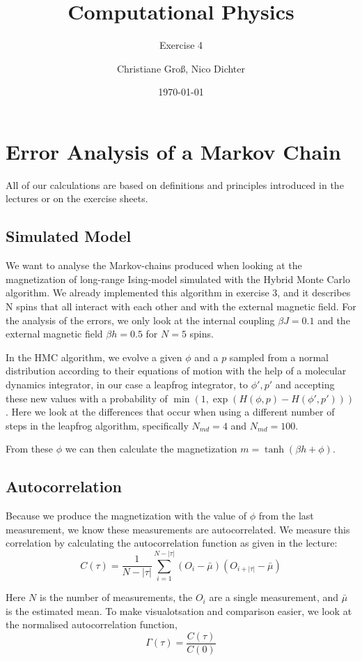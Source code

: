 \documentclass{scrartcl}
\title{Computational Physics}
\subtitle{Exercise 4}
\date{\today}
\author{Christiane Groß, Nico Dichter}
\begin{document}
	\maketitle
\section{Error Analysis of a Markov Chain}
All of our calculations are based on definitions and principles introduced in the lectures or on the exercise sheets.
\subsection{Simulated Model}
We want to analyse the Markov-chains produced when looking at the magnetization of long-range Ising-model simulated with the Hybrid Monte Carlo algorithm. We already implemented this algorithm in exercise 3, and it describes N spins that all interact with each other and with the external magnetic field. For the analysis of the errors, we only look at the internal coupling $\beta J=0.1$ and the external magnetic field $\beta h=0.5$ for $N=5$ spins. 
 
In the HMC algorithm, we evolve a given $\phi$ and a $p$ sampled from a normal distribution according to their equations of motion with the help of a molecular dynamics integrator, in our case a leapfrog integrator, to $\phi', p'$ and accepting these new values with a probability of $\min(1, \exp(H(\phi, p)-H(\phi', p')))$. Here we look at the differences that occur when using a different number of steps in the leapfrog algorithm, specifically $N_{md}=4$ and $N_{md}=100$.

From these $\phi$ we can then calculate the magnetization $m=\tanh(\beta h+\phi)$.

\subsection{Autocorrelation}

Because we produce the magnetization with the value of $\phi$ from the last measurement, we know these measurements are autocorrelated. We measure this correlation by calculating the autocorrelation function as given in the lecture:
\[
C(\tau)=\frac{1}{N-|\tau|}\sum_{i=1}^{N-|\tau|}(O_i-\bar{\mu})(O_{i+|\tau|}-\bar{\mu})\]

Here $N$ is the number of measurements, the $O_i$ are a single measurement, and $\bar{\mu}$ is the estimated mean. To make visualotsation and comparison easier, we look at the normalised autocorrelation function, \[
\Gamma(\tau)=\frac{C(\tau)}{C(0)}
\]
\end{document}
